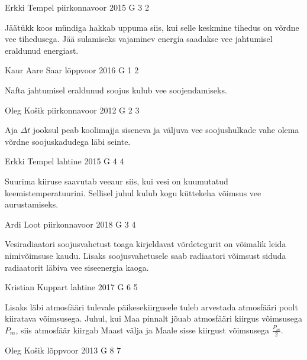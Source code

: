 \documentclass[11pt, twoside]{article}
\begin{document}
{%
{Erkki Tempel} %
{piirkonnavoor} %
{2015} %
{G 3} %
{2} %
{

\ifHint
Jäätükk koos mündiga hakkab uppuma siis, kui selle keskmine tihedus on võrdne vee tihedusega. Jää sulamiseks vajaminev energia saadakse vee jahtumisel eraldunud energiast.
\fi
}

{Kaur Aare Saar} %
{lõppvoor} %
{2016} %
{G 1} %
{2} %
{

\ifHint
Nafta jahtumisel eraldunud soojus kulub vee soojendamiseks.
\fi
}

{Oleg Košik} %
{piirkonnavoor} %
{2012} %
{G 2} %
{3} %
{

\ifHint
Aja $\Delta t$ jooksul peab koolimajja siseneva ja väljuva vee soojushulkade vahe olema võrdne soojuskadudega läbi seinte.
\fi
}

{Erkki Tempel} %
{lahtine} %
{2015} %
{G 4} %
{4} %
{

\ifHint
Suurima kiiruse saavutab veeaur siis, kui vesi on kuumutatud keemistemperatuurini. Sellisel juhul kulub kogu küttekeha võimsus vee aurustamiseks.
\fi
}

{Ardi Loot} %
{piirkonnavoor} %
{2018} %
{G 3} %
{4} %
{

\ifHint
Vesiradiaatori soojusvahetust toaga kirjeldavat võrdetegurit on võimalik leida nimivõimsuse kaudu. Lisaks soojusvahetusele saab radiaatori võimsust siduda radiaatorit läbiva vee siseenergia kaoga.
\fi
}

{Kristian Kuppart} %
{lahtine} %
{2017} %
{G 6} %
{5} %
{

\ifHint
Lisaks läbi atmosfääri tulevale päikesekiirgusele tuleb arvestada atmosfääri poolt kiiratava võimsusega. Juhul, kui Maa pinnalt jõuab atmosfääri kiirgus võimsusega $P_m$, siis atmosfäär kiirgab Maast välja ja Maale sisse kiirgust võimsusega $\frac{P_m}{2}$.
\fi
}

{Oleg Košik} %
{lõppvoor} %
{2013} %
{G 8} %
{7} %
{

}}
\end{document}
